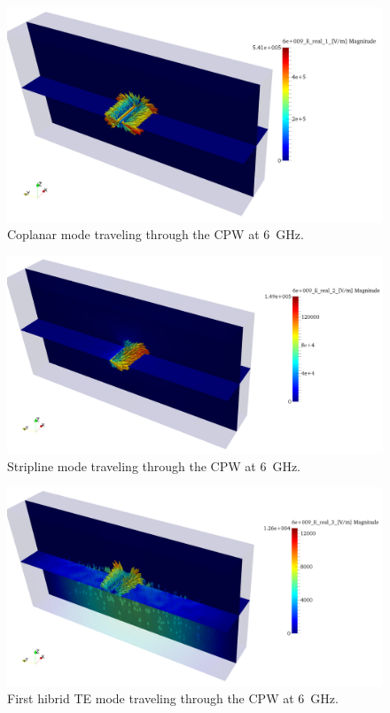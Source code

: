 \begin{figure}[h!]
\centering
\includegraphics[width=14.4cm]{CPWlin1}
\caption{Coplanar mode traveling through the CPW at 6~GHz.}
\label{fig:CPWlin1}
\end{figure}
\begin{figure}[h!]
\centering
\includegraphics[width=14.4cm]{CPWlin2}
\caption{Stripline mode traveling through the CPW at 6~GHz.}
\label{fig:CPWlin2}
\end{figure}
\begin{figure}[h!]
\centering
\includegraphics[width=14.4cm]{CPWlin3}
\caption{First hibrid TE mode traveling through the CPW at 6~GHz.}
\label{fig:CPWlin3}
\end{figure}

